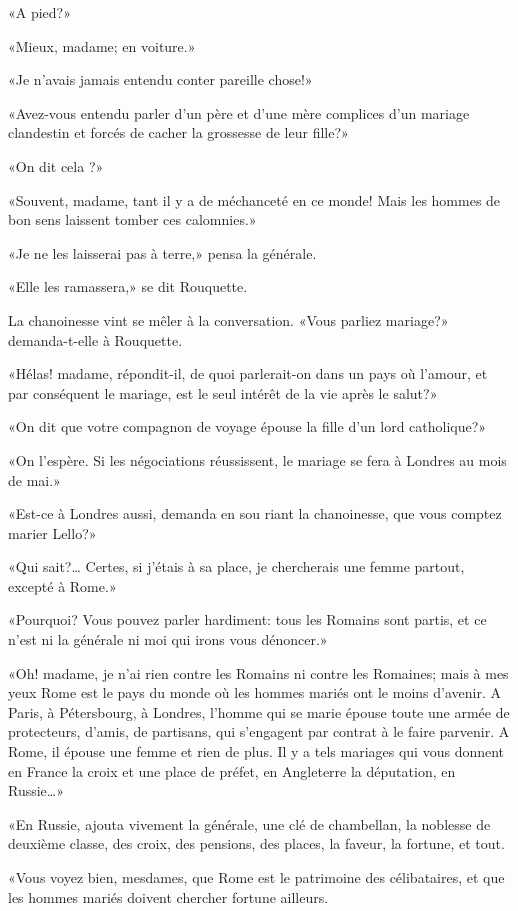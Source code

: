 «A pied?»

«Mieux, madame; en voiture.»

«Je n'avais jamais entendu conter pareille chose!»

«Avez-vous entendu parler d'un père et d'une mère complices d'un mariage
clandestin et forcés de cacher la grossesse de leur fille?»

«On dit cela ?»

«Souvent, madame, tant il y a de méchanceté en ce monde! Mais les hommes
de bon sens laissent tomber ces calomnies.»

«Je ne les laisserai pas à terre,» pensa la générale.

«Elle les ramassera,» se dit Rouquette.

La chanoinesse vint se mêler à la conversation. «Vous parliez mariage?»
demanda-t-elle à Rouquette.

«Hélas! madame, répondit-il, de quoi parlerait-on dans un pays où
l'amour, et par conséquent le mariage, est le seul intérêt de la vie
après le salut?»

«On dit que votre compagnon de voyage épouse la fille d'un lord
catholique?»

«On l'espère. Si les négociations réussissent, le mariage se fera à
Londres au mois de mai.»

«Est-ce à Londres aussi, demanda en sou riant la chanoinesse, que vous
comptez marier Lello?»

«Qui sait?\ldots{} Certes, si j'étais à sa place, je chercherais une
femme partout, excepté à Rome.»

«Pourquoi? Vous pouvez parler hardiment: tous les Romains sont partis,
et ce n'est ni la générale ni moi qui irons vous dénoncer.»

«Oh! madame, je n'ai rien contre les Romains ni contre les Romaines;
mais à mes yeux Rome est le pays du monde où les hommes mariés ont le
moins d'avenir. A Paris, à Pétersbourg, à Londres, l'homme qui se marie
épouse toute une armée de protecteurs, d'amis, de partisans, qui
s'engagent par contrat à le faire parvenir. A Rome, il épouse une femme
et rien de plus. Il y a tels mariages qui vous donnent en France la
croix et une place de préfet, en Angleterre la députation, en
Russie\ldots»

«En Russie, ajouta vivement la générale, une clé de chambellan, la
noblesse de deuxième classe, des croix, des pensions, des places, la
faveur, la fortune, et tout.

«Vous voyez bien, mesdames, que Rome est le patrimoine des célibataires,
et que les hommes mariés doivent chercher fortune ailleurs.


